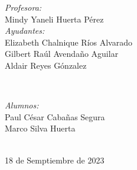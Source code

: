 \begin{titlepage}
\vspace{10mm}
\begin{minipage}{0.7\textwidth}
    \begin{flushleft} \large
        \emph{Profesora:}\\
            Mindy Yaneli Huerta Pérez \\
            \vspace{3mm}
            \emph{Ayudantes:}\\
            Elizabeth Chalnique Ríos Alvarado \\
            Gilbert Raúl Avendaño Aguilar \\
            Aldair Reyes Gónzalez
    \end{flushleft}
\end{minipage}
\\
\vspace{20mm}
\begin{minipage}{0.4\textwidth}
    \begin{flushright} \large
    \centering
        \emph{Alumnos:} \\ %
        \vspace{4mm}
        Paul César Cabañas Segura\\
        \vspace{3mm}
        Marco Silva Huerta \\        
    \end{flushright}
\end{minipage}\\[2.6cm]
\makeatother
{\large 18 de Semptiembre de 2023}\\[2cm]
\vfill 
\end{titlepage}